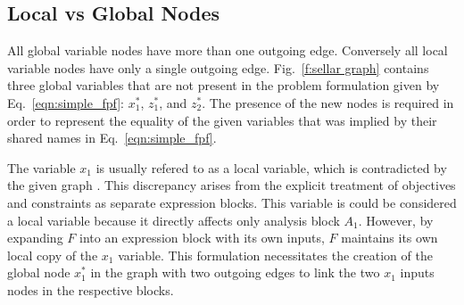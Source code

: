 
%
%

\subsection{Local vs Global Nodes }

  All global variable nodes have more than one outgoing edge. Conversely all local 
  variable nodes have only a single outgoing edge. Fig.~\ref{f:sellar graph} contains 
  three global variables that are not present in the problem formulation given by 
  Eq.~\ref{eqn:simple_fpf}: $x_1^*$, $z_1^*$, and $z_2^*$. The presence of the 
  new nodes is required in order to represent the equality of the given variables that
  was implied by their shared names in Eq.~\ref{eqn:simple_fpf}. 

  The variable $x_1$ is usually refered to as a local variable, which is 
  contradicted by the given graph \cite{sellar1996}. This discrepancy 
  arises from the explicit treatment of objectives and constraints as separate 
  expression blocks. This variable is could be considered a local 
  variable because it directly affects only analysis block $A_1$. However, by expanding
  $F$ into an expression block with its own inputs, $F$ maintains its own local 
  copy of the $x_1$ variable. This formulation necessitates the creation of the global 
  node $x_1^*$ in the graph with two outgoing edges to link the two $x_1$ inputs nodes 
  in the respective blocks. 

